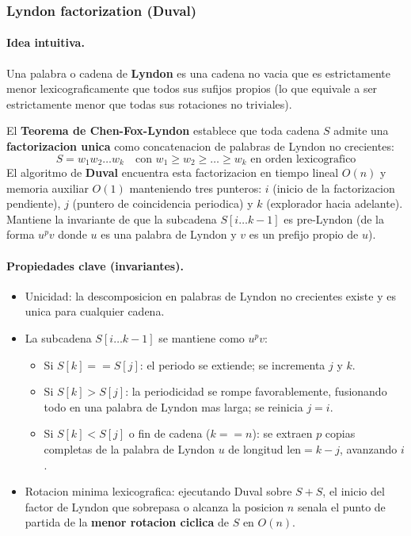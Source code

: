 \subsubsection{Lyndon factorization (Duval)}

\paragraph{Idea intuitiva.}
Una palabra o cadena de \textbf{Lyndon} es una cadena no vacia que es estrictamente menor lexicograficamente que todos sus sufijos propios (lo que equivale a ser estrictamente menor que todas sus rotaciones no triviales).

El \textbf{Teorema de Chen-Fox-Lyndon} establece que toda cadena $S$ admite una \textbf{factorizacion unica} como concatenacion de palabras de Lyndon no crecientes:
\[
S = w_1 w_2 \dots w_k \quad \text{con } w_1 \ge w_2 \ge \dots \ge w_k \text{ en orden lexicografico}
\]
El algoritmo de \textbf{Duval} encuentra esta factorizacion en tiempo lineal $O(n)$ y memoria auxiliar $O(1)$ manteniendo tres punteros: $i$ (inicio de la factorizacion pendiente), $j$ (puntero de coincidencia periodica) y $k$ (explorador hacia adelante). Mantiene la invariante de que la subcadena $S[i \dots k-1]$ es pre-Lyndon (de la forma $u^p v$ donde $u$ es una palabra de Lyndon y $v$ es un prefijo propio de $u$).

\paragraph{Propiedades clave (invariantes).}
\begin{itemize}\setlength\itemsep{0pt}
	\item Unicidad: la descomposicion en palabras de Lyndon no crecientes existe y es unica para cualquier cadena.
	\item La subcadena $S[i \dots k-1]$ se mantiene como $u^p v$:
	\begin{itemize}\setlength\itemsep{0pt}
		\item Si $S[k] == S[j]$: el periodo se extiende; se incrementa $j$ y $k$.
		\item Si $S[k] > S[j]$: la periodicidad se rompe favorablemente, fusionando todo en una palabra de Lyndon mas larga; se reinicia $j = i$.
		\item Si $S[k] < S[j]$ o fin de cadena ($k == n$): se extraen $p$ copias completas de la palabra de Lyndon $u$ de longitud $\text{len} = k - j$, avanzando $i$.
	\end{itemize}
	\item Rotacion minima lexicografica: ejecutando Duval sobre $S + S$, el inicio del factor de Lyndon que sobrepasa o alcanza la posicion $n$ senala el punto de partida de la \textbf{menor rotacion ciclica} de $S$ en $O(n)$.
\end{itemize}

